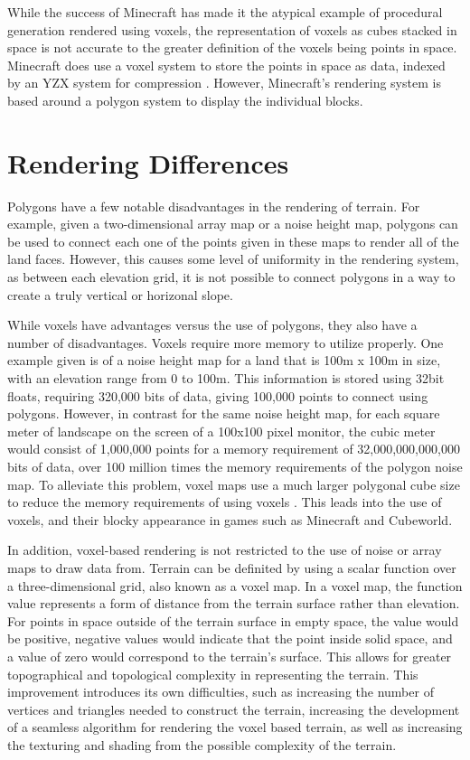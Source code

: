 \documentclass[10pt]{report}
\begin{document}
		While the success of Minecraft has made it the atypical example of procedural generation rendered using voxels, the representation of voxels as cubes stacked in space is not accurate to the greater definition of the voxels being points in space. Minecraft does use a voxel system to store the points in space as data, indexed by an YZX system for compression \cite{minecraft-voxel}. However, Minecraft's rendering system is based around a polygon system to display the individual blocks. 
		
		\section{Rendering Differences}
		Polygons have a few notable disadvantages in the rendering of terrain. For example, given a two-dimensional array map or a noise height map, polygons can be used to connect each one of the points given in these maps to render all of the land faces. However, this causes some level of uniformity in the rendering system, as between each elevation grid, it is not possible to connect polygons in a way to create a truly vertical or horizonal slope. 
		
		While voxels have advantages versus the use of polygons, they also have a number of disadvantages. Voxels require more memory to utilize properly. One example given is of a noise height map for a land that is 100m x 100m in size, with an elevation range from 0 to 100m. This information is stored using 32bit floats, requiring 320,000 bits of data, giving 100,000 points to connect using polygons. However, in contrast for the same noise height map, for each square meter of landscape on the screen of a 100x100 pixel monitor, the cubic meter would consist of 1,000,000 points for a memory requirement of 32,000,000,000,000 bits of data, over 100 million times the memory requirements of the polygon noise map. To alleviate this problem, voxel maps use a much larger polygonal cube size to reduce the memory requirements of using voxels \cite{high-level-voxel}. This leads into the use of voxels, and their blocky appearance in games such as Minecraft and Cubeworld.
		
		In addition, voxel-based rendering is not restricted to the use of noise or array maps to draw data from. Terrain can be definited by using a scalar function over a three-dimensional grid, also known as a voxel map. In a voxel map, the function value represents a form of distance from the terrain surface rather than elevation. For points in space outside of the terrain surface in empty space, the value would be positive, negative values would indicate that the point inside solid space, and a value of zero would correspond to the terrain's surface. This allows for greater topographical and topological complexity in representing the terrain. This improvement introduces its own difficulties, such as increasing the number of vertices and triangles needed to construct the terrain, increasing the development of a seamless algorithm for rendering the voxel based terrain, as well as increasing the texturing and shading from the possible complexity of the terrain. 
		
\end{document}

